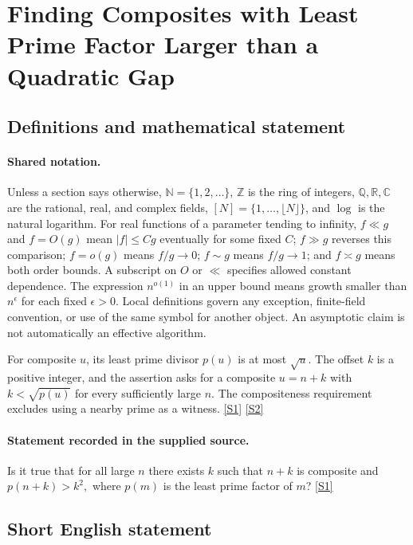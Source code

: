 \documentclass[11pt,a4paper]{article}
\newcommand{\N}{\mathbb{N}}
\newcommand{\Z}{\mathbb{Z}}
\newcommand{\Q}{\mathbb{Q}}
\newcommand{\R}{\mathbb{R}}
\newcommand{\C}{\mathbb{C}}
\newcommand{\sref}[2]{\hyperlink{source:#1:#2}{[S#2]}}
\begin{document}
\section{Finding Composites with Least Prime Factor Larger than a Quadratic Gap}\label{statement}


\subsection{Definitions and mathematical statement}

\paragraph{Shared notation.}Unless a section says otherwise, $\N=\{1,2,\ldots\}$,
$\Z$ is the ring of integers, $\Q,\R,\C$ are the rational, real, and complex
fields, $[N]=\{1,\ldots,\lfloor N\rfloor\}$, and $\log$ is the natural
logarithm. For real functions of a parameter tending to infinity,
$f\ll g$ and $f=O(g)$ mean $|f|\leq Cg$ eventually for some fixed $C$;
$f\gg g$ reverses this comparison; $f=o(g)$ means $f/g\to0$;
$f\sim g$ means $f/g\to1$; and $f\asymp g$ means both order bounds.
A subscript on $O$ or $\ll$ specifies allowed constant dependence.
The expression $n^{o(1)}$ in an upper bound means growth smaller than
$n^\epsilon$ for each fixed $\epsilon>0$. Local definitions govern any
exception, finite-field convention, or use of the same symbol for another
object. An asymptotic claim is not automatically an effective algorithm.



For composite $u$, its least prime divisor $p(u)$ is at most $\sqrt u$. The offset $k$ is a positive integer, and the assertion asks for a composite $u=n+k$ with $k<\sqrt{p(u)}$ for every sufficiently large $n$. The compositeness requirement excludes using a nearby prime as a witness. \sref{statement}{1} \sref{statement}{2}

\paragraph{Statement recorded in the supplied source.}
Is it true that for all large $n$ there exists $k$ such that $n+k$ is composite and $ p(n+k)>k^2, $ where $p(m)$ is the least prime factor of $m$? \sref{statement}{1}

\subsection{Short English statement}
\end{document}
